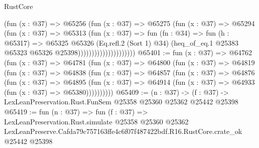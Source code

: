 \begin{lexlean}{RustCore}
\begin{coremodule}
                                  (fun (x : @37) =>
                                  @65256
                                    (fun (x : @37) =>
                                    @65275
                                      (fun (x : @37) =>
                                      @65294
                                        (fun (x : @37) =>
                                        @65313
                                          (fun (x : @37) =>
                                          fun (fn : @34) =>
                                          fun (h : @65317) =>
                                          @65325
                                            @65326
                                            (Eq.refl.{2} (Sort 1) @34)
                                            (heq_of_eq.{1}
                                              @25383
                                              @65323
                                              @65326
                                              @25398)))))))))))))))))))))
@65401 := fun (x : @37) =>
  @64762
    (fun (x : @37) =>
    @64781
      (fun (x : @37) =>
      @64800
        (fun (x : @37) =>
        @64819
          (fun (x : @37) =>
          @64838
            (fun (x : @37) =>
            @64857
              (fun (x : @37) =>
              @64876
                (fun (x : @37) =>
                @64895
                  (fun (x : @37) =>
                  @64914 (fun (x : @37) => @64933 (fun (x : @37) => @65380))))))))))
@65409 := (n : @37) ->
  (f : @37) -> LexLeanPreservation.Rust.FunSem @25358 @25360 @25362 @25442 @25398
@65419 := fun (n : @37) =>
  fun (f : @37) =>
  LexLeanPreservation.Rust.simulate
    @25358
    @25360
    @25362
    LexLeanPreserve.Cafda79c757163ffe4c6f07f487422bdf.R16.RustCore.crate_ok
    @25442
    @25398
\end{coremodule}
\end{lexlean}
